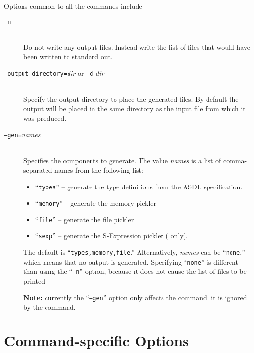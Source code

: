 Options common to all the commands include
\begin{description}
  \item[\normalfont\texttt{-n}] \mbox{}\\
    Do not write any output files.
    Instead write the list of files that would have been written to standard out.
  \item[\normalfont\texttt{--output-directory=}\textit{dir} or \texttt{-d} \textit{dir}] \mbox{}\\
    Specify the output directory to place the generated files.
    By default the output will be placed in the same directory as the
    input file from which it was produced.
  \item[\normalfont\texttt{--gen=}\textit{names}] \mbox{}\\
    Specifies the components to generate.  The value \textit{names} is a list of
    comma-separated names from the following list:
    \begin{itemize}
      \item ``\texttt{types}'' -- generate the type definitions from the ASDL specification.
      \item ``\texttt{memory}'' -- generate the memory pickler
      \item ``\texttt{file}'' -- generate the file pickler
      \item ``\texttt{sexp}'' -- generate the S-Expression pickler (\sml{} only).
    \end{itemize}%
    The default is ``\texttt{types,memory,file}.''
    Alternatively, \textit{names} can be ``\texttt{none},'' which means that
    no output is generated.  Specifying
    ``\texttt{none}'' is different than using the ``\texttt{-n}'' option, because
    it does not cause the list of files to be printed.
    
    \textbf{Note:} currently the ``\texttt{--gen}'' option only affects the \sml{}
    command; it is ignored by the \Cplusplus{} command.
\end{description}%

\section*{Command-specific Options}

